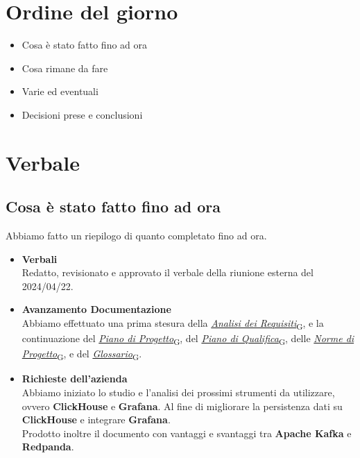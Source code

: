 \documentclass[italian,12pt]{article}
\begin{document}
\section{Ordine del giorno}
\begin{itemize}
	\item Cosa è stato fatto fino ad ora
	\item Cosa rimane da fare
	\item Varie ed eventuali
	\item Decisioni prese e conclusioni
\end{itemize}

\newpage

\section{Verbale}

\subsection{Cosa è stato fatto fino ad ora}
Abbiamo fatto un riepilogo di quanto completato fino ad ora.
\begin{itemize}
	\item \textbf{Verbali} \\
	Redatto, revisionato e approvato il verbale della riunione esterna del 2024/04/22.
	\item \textbf{Avanzamento Documentazione} \\
	Abbiamo effettuato una prima stesura della \href{https://7last.github.io/docs/rtb/documentazione-interna/glossario#analisi-dei-requisiti}{\textit{Analisi dei Requisiti}\textsubscript{G}}, e la continuazione del \href{https://7last.github.io/docs/rtb/documentazione-interna/glossario#piano-di-progetto}{\textit{Piano di Progetto}\textsubscript{G}}, del \href{https://7last.github.io/docs/rtb/documentazione-interna/glossario#piano-di-qualifica}{\textit{Piano di Qualifica}\textsubscript{G}}, delle \href{https://7last.github.io/docs/rtb/documentazione-interna/glossario#norme-di-progetto}{\textit{Norme di Progetto}\textsubscript{G}}, e del \href{https://7last.github.io/docs/rtb/documentazione-interna/glossario#glossario}{\textit{Glossario}\textsubscript{G}}.
	\item \textbf{Richieste dell'azienda} \\
	Abbiamo iniziato lo studio e l'analisi dei prossimi strumenti da utilizzare, ovvero \textbf{ClickHouse} e \textbf{Grafana}. Al fine di migliorare la persistenza dati su \textbf{ClickHouse} e integrare \textbf{Grafana}. \\
	Prodotto inoltre il documento con vantaggi e svantaggi tra \textbf{Apache Kafka} e \textbf{Redpanda}.
\end{itemize}
\end{document}
